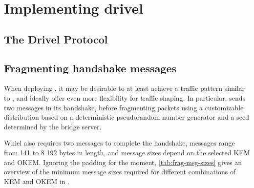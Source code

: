 \chapter{Implementing drivel}\label{ch:implementation}


\section{The Drivel Protocol} \label{sec:drivel}


\section{Fragmenting handshake messages} \label{sec:fragmentation}

When deploying \drivel{}, it may be desirable to at least achieve a traffic pattern similar to \obfsfour{}, and ideally offer even more flexibility for traffic shaping. In particular, \obfsfour{} sends two messages in its handshake, before fragmenting packets using a customizable distribution based on a deterministic pseudorandom number generator and a seed determined by the bridge server.

Whiel \drivel{} also requires two messages to complete the handshake, \obfsfour{} messages range from 141 to 8 192 bytes in length, and \drivel{} message sizes depend on the selected KEM and OKEM. Ignoring the padding for the moment, \cref{tab:frag-msg-sizes} gives an overview of the minimum message sizes required for different combinations of KEM and OKEM in \drivel{}.

